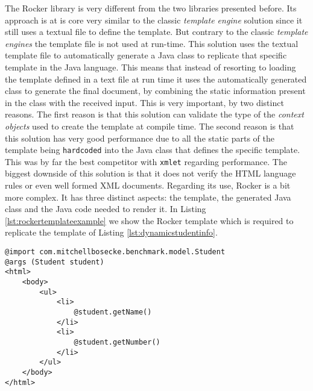 The Rocker\cite{rocker} library is very different from the two libraries presented before. Its approach is at is core very similar to the classic \textit{template engine} solution since it still uses a textual file to define the template. But contrary to the classic \textit{template engines} the template file is not used at run-time. This solution uses the textual template file to automatically generate a Java class to replicate that specific template in the Java language. This means that instead of resorting to loading the template defined in a text file at run time it uses the automatically generated class to generate the final document, by combining the static information present in the class with the received input. This is very important, by two distinct reasons. The first reason is that this solution can validate the type of the \textit{context objects} used to create the template at compile time. The second reason is that this solution has very good performance due to all the static parts of the template being \texttt{hardcoded} into the Java class that defines the specific template. This was by far the best competitor with \texttt{xmlet} regarding performance. The biggest downside of this solution is that it does not verify the \ac{HTML} language rules or even well formed \ac{XML} documents. Regarding its use, Rocker is a bit more complex. It has three distinct aspects: the template, the generated Java class and the Java code needed to render it. In Listing \ref{lst:rockertemplateexample} we show the Rocker template which is required to replicate the template of Listing \ref{lst:dynamicstudentinfo}.

\bigskip

\lstset{language=html}

\begin{minipage}{\linewidth}
\begin{lstlisting}[caption={Rocker Template Example}, label={lst:rockertemplateexample}]
@import com.mitchellbosecke.benchmark.model.Student
@args (Student student)
<html>
    <body>
        <ul>
            <li>
                @student.getName()
            </li>
            <li>
                @student.getNumber()
            </li>
        </ul>
    </body>
</html>
\end{lstlisting}
\end{minipage}

